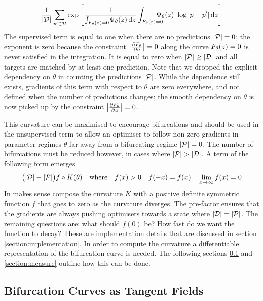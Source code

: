 \begin{align}
    \frac{1}{|\targets|}\sum_{p'\in\targets}
    \exp\left[
        \frac{1}{\int_{\rates(z)=0}\!\measure(z)\,\mathrm{d}z}
            \int_{\rates(z)=0}\!\!\!\!\!\!\!\!\!\!\!\!\!\quad\measure(z)\,\,\log|p-p'|
        \,\mathrm{d}z
    \right]
    \label{eq:supervised-term}
\end{align}
The supervised term is equal to one when there are no predictions $|\mathcal{P}|=0$; the exponent is zero because the constraint $\left| \frac{\partial F_{\theta}}{\partial u} \right|=0$ along the curve $F_{\theta}(z)=0$ is never satisfied in the integration. It is equal to zero when $|\mathcal{P}|\geq|\mathcal{D}|$ and all targets are matched by at least one prediction. Note that we dropped the explicit dependency on $\theta$ in counting the predictions $|\mathcal{P}|$. While the dependence still exists, gradients of this term with respect to $\theta$ are zero everywhere, and not defined when the number of predictions changes; the smooth dependency on $\theta$ is now picked up by the constraint $\left| \frac{\partial F_{\theta}}{\partial u} \right|=0$.

This curvature can be maximised to encourage bifurcations and should be used in the unsupervised term to allow an optimiser to follow non-zero gradients in parameter regimes $\theta$ far away from a bifurcating regime $|\mathcal{P}|=0$. The number of bifurcations must be reduced however, in cases where $|\predictions|>|\targets|$. A term of the following form emerges
\begin{align}
    \big(|\mathcal{D}|-|\mathcal{P}|\big)f \circ K(\theta)
    \quad\mathrm{where}\quad f(x)> 0 \quad f(-x)=f(x)\quad\lim_{x\rightarrow\infty}f(x)=0
\end{align}
In makes sense compose the curvature $K$ with a positive definite symmetric function $f$ that goes to zero as the curvature diverges. The pre-factor ensures that the gradients are always pushing optimisers towards a state where $|\mathcal{D}|=|\mathcal{P}|$. The remaining questions are: what should $f(0)$ be? How fast do we want the function to decay? These are implementation details that are discussed in section \ref{section:implementation}. In order to compute the curvature a differentiable representation of the bifurcation curve is needed. The following sections \ref{section:tangent-fields} and \ref{section:measure} outline how this can be done.

\subsection{Bifurcation Curves as Tangent Fields}
\label{section:tangent-fields}

